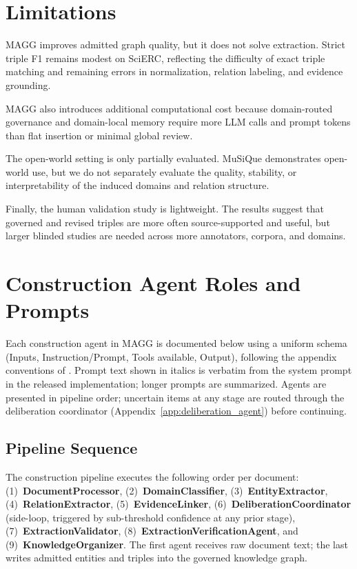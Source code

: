 \documentclass{article}
\newcommand{\system}{\textsc{MAGG}}
\begin{document}
\section{Limitations}
\label{app:limitations}
\system{} improves admitted graph quality, but it does not solve extraction. Strict triple F1 remains modest on SciERC, reflecting the difficulty of exact triple matching and remaining errors in normalization, relation labeling, and evidence grounding.

MAGG also introduces additional computational cost because domain-routed governance and domain-local memory require more LLM calls and prompt tokens than flat insertion or minimal global review.

The open-world setting is only partially evaluated. MuSiQue demonstrates open-world use, but we do not separately evaluate the quality, stability, or interpretability of the induced domains and relation structure.

Finally, the human validation study is lightweight. The results suggest that governed and revised triples are more often source-supported and useful, but larger blinded studies are needed across more annotators, corpora, and domains.

\setcounter{section}{3}
\section{Construction Agent Roles and Prompts}
\label{app:agents}

Each construction agent in \system{} is documented below using a
uniform schema (Inputs, Instruction/Prompt, Tools available, Output),
following the appendix conventions of \citet{lu2025karma}. Prompt text
shown in italics is verbatim from the system prompt in the released
implementation; longer prompts are summarized. Agents are presented in
pipeline order; uncertain items at any stage are routed through the
deliberation coordinator (Appendix~\ref{app:deliberation_agent}) before
continuing.

\subsection{Pipeline Sequence}

The construction pipeline executes the following order per document:
(1)~\textbf{DocumentProcessor}, (2)~\textbf{DomainClassifier},
(3)~\textbf{EntityExtractor}, (4)~\textbf{RelationExtractor},
(5)~\textbf{EvidenceLinker}, (6)~\textbf{DeliberationCoordinator}
(side-loop, triggered by sub-threshold confidence at any prior stage),
(7)~\textbf{ExtractionValidator}, (8)~\textbf{ExtractionVerificationAgent},
and (9)~\textbf{KnowledgeOrganizer}. The first agent receives raw
document text; the last writes admitted entities and triples into the
governed knowledge graph.
\end{document}
